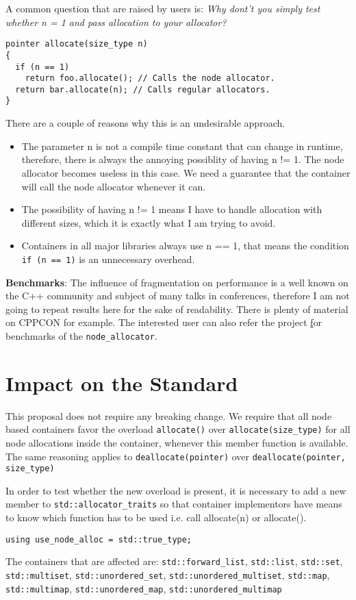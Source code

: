 \documentclass[11pt]{article}
\begin{document}
A common question that are raised by users is: {\it Why dont't you
simply test whether n = 1 and pass allocation to your allocator?}

\begin{lstlisting}
pointer allocate(size_type n)
{
  if (n == 1)
    return foo.allocate(); // Calls the node allocator.
  return bar.allocate(n); // Calls regular allocators.
}
\end{lstlisting}

There are a couple of reasons why this is an undesirable approach.

\begin{itemize}
\item The parameter n is not a compile time constant that can change
in runtime, therefore, there is always the annoying possiblity of
having n != 1. The node allocator becomes useless in this case.  We
need a guarantee that the container will call the node allocator
whenever it can.

\item The possibility of having n != 1 means I have to handle
allocation with different sizes, which it is exactly what I am trying
to avoid.

\item Containers in all major libraries always use n == 1, that means
the condition \texttt{if (n == 1)} is an unnecessary overhead.
\end{itemize}

\medskip
\noindent
{\bf Benchmarks}: The influence of fragmentation on performance is a well known
on the C++ community and subject of many talks in conferences, therefore I am
not going to repeat results here for the sake of readability. There is plenty
of material on CPPCON for example.  The interested user can also refer the
project \href{https://github.com/mzimbres/rtcpp} for benchmarks of the
\texttt{node\_allocator}.

\section{Impact on the Standard}

This proposal does not require any breaking change. We require
that all node based containers favor the overload \texttt{allocate()}
over \texttt{allocate(size\_type)} for all node allocations inside the
container, whenever this member function is available. The same
reasoning applies to \texttt{deallocate(pointer)} over
\texttt{deallocate(pointer, size\_type)}

In order to test whether the new overload is present, it is
necessary to add a new member to \texttt{std::allocator\_traits} so
that container implementors have means to know which function has
to be used i.e. call allocate(n) or allocate().

\begin{lstlisting}
using use_node_alloc = std::true_type;
\end{lstlisting}

The containers that are affected are: \texttt{std::forward\_list},
\texttt{std::list}, \texttt{std::set}, \texttt{std::multiset}, \texttt{std::unordered\_set},
\texttt{std::unordered\_multiset}, \texttt{std::map}, \texttt{std::multimap},
\texttt{std::unordered\_map}, \texttt{std::unordered\_multimap}
\end{document}
